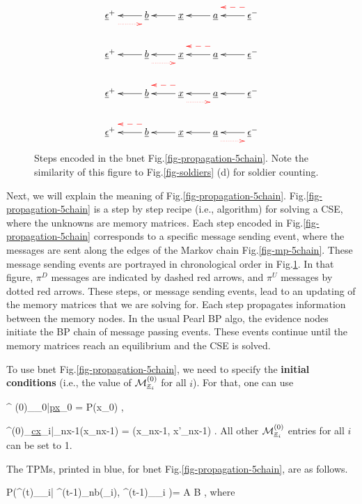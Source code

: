 \begin{figure}[h!]
$$
\xymatrix{
\rveps^+\ar@[red]@{.>}@<-2ex>[r]
&\rvb\ar[l]
&\rvx\ar[l]
&\rva\ar[l]
&\rveps^-\ar[l]\ar@[red]@{-->}@<-2ex>[l]
\\
\rveps^+
&\rvb\ar[l]\ar@[red]@{.>}@<-2ex>[r]
&\rvx\ar[l]
&\rva\ar[l]\ar@[red]@{-->}@<-2ex>[l]
&\rveps^-\ar[l]
\\
\rveps^+
&\rvb\ar[l]
&\rvx\ar[l]\ar@[red]@{.>}@<-2ex>[r]
\ar@[red]@{-->}@<-2ex>[l]
&\rva\ar[l]
&\rveps^-\ar[l]
\\
\rveps^+
&\rvb\ar[l]\ar@[red]@{-->}@<-2ex>[l]
&\rvx\ar[l]
&\rva\ar[l]\ar@[red]@{.>}@<-2ex>[r]
&\rveps^-\ar[l]
}$$
\caption{
Steps encoded in the
bnet
Fig.\ref{fig-propagation-5chain}.
Note the
similarity
of this figure
to Fig.\ref{fig-soldiers} (d)
for soldier counting.
}
\label{fig-multiframe-5chain}
\end{figure}

Next, we will
explain the meaning
of Fig.\ref{fig-propagation-5chain}.
Fig.\ref{fig-propagation-5chain}
is a step by step
recipe (i.e., algorithm)
for solving a CSE,
where the unknowns are
memory matrices.
Each step
encoded in
Fig.\ref{fig-propagation-5chain}
corresponds to a
specific
message sending event,
where the messages
are sent
along the edges
of the Markov chain
Fig.\ref{fig-mp-5chain}.
These message sending
events are portrayed in
chronological order
in Fig.\ref{fig-multiframe-5chain}.
In that figure,
$\pi^D$ messages
are indicated by
dashed red arrows,
and $\pi^U$ messages
by dotted red arrows.
These steps, or
message  sending events,
lead to an updating
of the memory matrices
that we are solving for.
Each step propagates information
between the memory nodes.
In the usual Pearl BP algo,
the evidence nodes
initiate the BP
chain of
message passing events.
These events
continue
until
the
memory
matrices
reach an equilibrium
and the CSE is solved.


To use
bnet
Fig.\ref{fig-propagation-5chain},
we need to specify
the {\bf initial conditions}
(i.e., the value of
$\calm^{(0)}_{\rvx_i}$
for all $i$).
For that, one can use

\beq
\pi^{ (0)}_{\rvx_0|\ul{px}_0}
=
P(x_0)
\;,
\eeq

\beq
\pi^{(0)}_{\ul{cx}_i|\rvx_{nx-1}}(x_{nx-1})
=
\delta(x_{nx-1}, x'_{nx-1})
\;.
\eeq
All other $\calm^{(0)}_{\rvx_i}$ entries
for all $i$ can be set to 1.

The TPMs, printed in blue, for
bnet Fig.\ref{fig-propagation-5chain},
are as follows.

\beq\color{blue}
P(\calm^{(t)}_{\rvx_i}|
\calm^{(t-1)}_{\rvn\in nb(\rvx_i)},
\calm^{(t-1)}_{\rvx_i}
)= A B
\;,
\eeq
where

